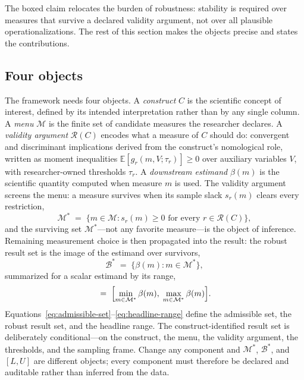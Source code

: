 \documentclass[10pt,letterpaper]{article}
\newcommand{\M}{\ensuremath{\mathcal{M}}}
\newcommand{\E}{\mathbb{E}}
\newcommand{\Rset}{\mathcal{R}}
\newcommand{\Bset}{\mathcal{B}}
\begin{document}
\vspace{0.5em}
\noindent{}
\vspace{0.5em}

The boxed claim relocates the burden of robustness: stability is required over measures that survive a declared validity argument, not over all plausible operationalizations.
The rest of this section makes the objects precise and states the contributions.

\subsection{Four objects}
The framework needs four objects.
A \emph{construct} $C$ is the scientific concept of interest, defined by its intended interpretation rather than by any single column.
A \emph{menu} $\M$ is the finite set of candidate measures the researcher declares.
A \emph{validity argument} $\Rset(C)$ encodes what a measure of $C$ should do: convergent and discriminant implications derived from the construct's nomological role, written as moment inequalities $\E[g_r(m,V;\tau_r)]\ge 0$ over auxiliary variables $V$, with researcher-owned thresholds $\tau_r$.
A \emph{downstream estimand} $\beta(m)$ is the scientific quantity computed when measure $m$ is used.
The validity argument screens the menu: a measure survives when its sample slack $s_r(m)$ clears every restriction,
\begin{equation}
\M^* \;=\; \bigl\{ m \in \M : s_r(m) \ge 0 \text{ for every } r \in \Rset(C) \bigr\},
\label{eq:admissible-set}
\end{equation}
and the surviving set $\M^*$---not any favorite measure---is the object of inference.
Remaining measurement choice is then propagated into the result: the robust result set is the image of the estimand over survivors,
\begin{equation}
\Bset^* \;=\; \bigl\{ \beta(m) : m \in \M^* \bigr\},
\label{eq:robust-image}
\end{equation}
summarized for a scalar estimand by its range,
\begin{equation}
[L,U] \;=\; \Bigl[ \min_{m\in\M^*} \beta(m),\; \max_{m\in\M^*} \beta(m) \Bigr].
\label{eq:headline-range}
\end{equation}
Equations~\eqref{eq:admissible-set}--\eqref{eq:headline-range} define the admissible set, the robust result set, and the headline range.
The construct-identified result set is deliberately conditional---on the construct, the menu, the validity argument, the thresholds, and the sampling frame.
Change any component and $\M^*$, $\Bset^*$, and $[L,U]$ are different objects; every component must therefore be declared and auditable rather than inferred from the data.
\end{document}
